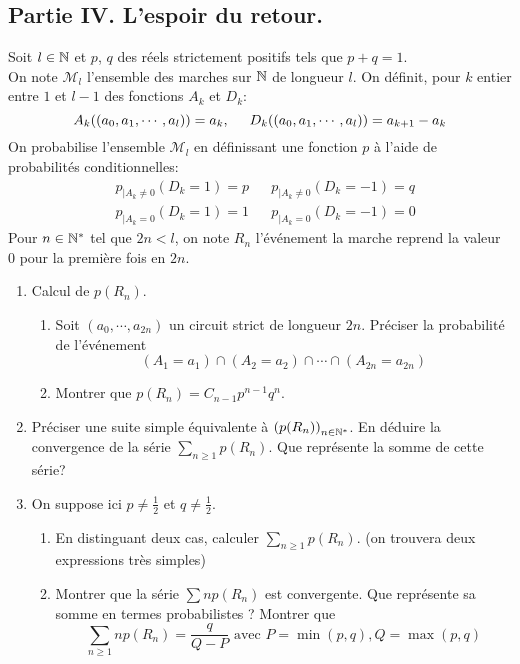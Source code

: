 \subsection*{Partie IV. L'espoir du retour.}
Soit $l\in \mathbb{N}$ et $p$, $q$ des réels strictement positifs tels que $p+q=1$.\\
On note $\mathcal{M}_l$ l'ensemble des marches sur $\mathbb{N}$ de longueur $l$. On définit, pour $k$ entier entre $1$ et $l-1$ des fonctions $A_k$ et $D_k$:
\begin{displaymath}
  A_k((a_0,a_1,\cdots,a_l))= a_k,\hspace{0.5cm}
  D_k((a_0,a_1,\cdots,a_l))= a_{k+1} - a_k
\end{displaymath}
On probabilise l'ensemble $\mathcal{M}_l$ en définissant une fonction $p$ à l'aide de probabilités conditionnelles:
\begin{align*}
  &p_{|A_k \neq 0}(D_k = 1) = p & & p_{|A_k \neq 0}(D_k = -1) = q \\
  &p_{|A_k = 0}(D_k = 1) = 1 & & p_{|A_k = 0}(D_k = -1) = 0
\end{align*}
Pour $n\in \mathbb{N}^*$ tel que $2n<l$, on note $R_n$ l'événement \og la marche reprend la valeur $0$ pour la première fois en $2n$\fg.
\begin{enumerate}
  \item Calcul de $p(R_n)$.
\begin{enumerate}
\item Soit $(a_0,\cdots,a_{2n})$ un circuit strict de longueur $2n$. Préciser la probabilité de l'événement
\begin{displaymath}
(A_1 = a_1)\cap (A_2 = a_2)\cap \cdots \cap (A_{2n} = a_{2n})   
\end{displaymath}
\item Montrer que $p(R_n)= C_{n-1} p^{n-1}q^{n}$.
\end{enumerate}

\item Préciser une suite simple équivalente à $\left( p(R_n)\right)_{n\in \mathbb{N}^*}$. En déduire la convergence de la série $\sum_{n\geq1}p(R_n)$. Que représente la somme de cette série?

\item On suppose ici $p\neq \frac{1}{2}$ et $q\neq \frac{1}{2}$.
\begin{enumerate}
  \item En distinguant deux cas, calculer $\sum_{n\geq 1} p(R_n)$. (on trouvera deux expressions très simples)
  \item Montrer que la série $\sum np(R_n)$ est convergente. Que représente sa somme en termes probabilistes ? Montrer que 
\begin{displaymath}
\sum_{n\geq 1} np(R_n) = \frac{q}{Q-P}\text{ avec } P=\min(p,q), Q = \max(p,q)  
\end{displaymath}
\end{enumerate}

\end{enumerate}

